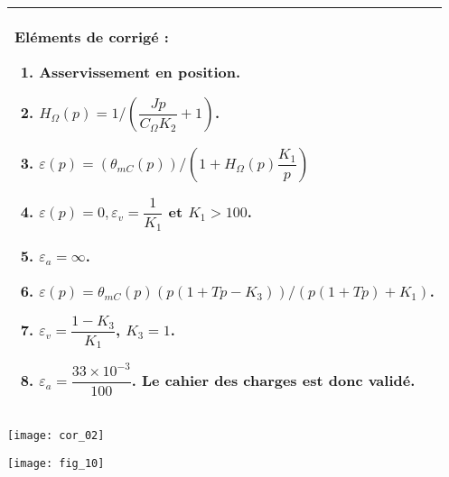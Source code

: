 \begin{multicols}{2}
\ifcolle
\else
\ifprof
\else
\footnotesize
\begin{tabular}{|p{\linewidth}|}
\hline
Eléments de corrigé :
\begin{enumerate}
\item Asservissement en position.
\item $H_{\Omega}(p)= {1}/\left(\dfrac{Jp}{C_{\Omega} K_2}+1 \right) $.
\item $\varepsilon(p)=\left( \theta_{mC}(p)\right)/\left( 1+H_{\Omega}(p) \dfrac{K_1}{p}\right)$
\item $\varepsilon(p)= 0, \varepsilon_v = \dfrac{1}{K_1}$   et $K_1 >100$.
\item $\varepsilon_a = \infty$.
\item $\varepsilon(p) = \theta_{mC}(p)\left(p\left( 1+Tp-K_3\right) \right)/\left(p \left( 1+Tp\right)+K_1\right) $.
\item $\varepsilon_v =\dfrac{1-K_3}{K_1}$, $K_3=1$.
\item $\varepsilon_a = \dfrac{33\times 10^{-3}}{100} $. Le cahier des charges est donc validé. 
\end{enumerate} \\
\hline
\end{tabular}
\normalsize
\fi
\fi
\ifprof
\else
\end{multicols}
\fi
\ifprof
\begin{center}
\texttt{[image: cor\_02]}
\end{center}

\else
\begin{center}
\texttt{[image: fig\_10]}
\end{center}
\fi
